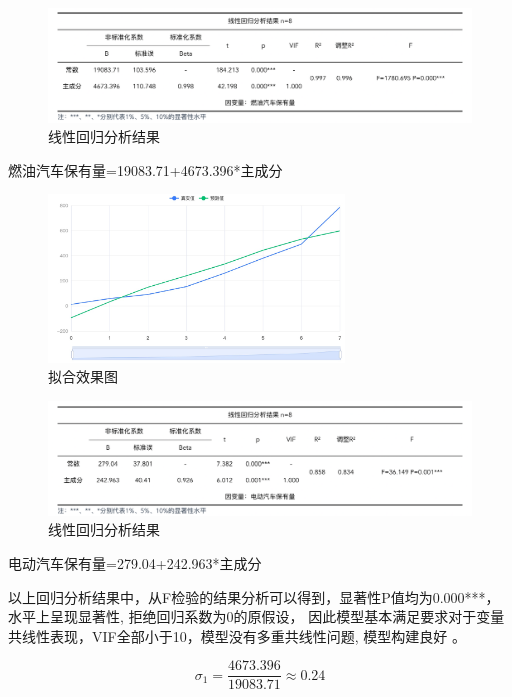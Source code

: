 \documentclass[12pt, a4paper, oneside]{ctexart}
\begin{document}
\begin{figure}[H]
  \centering
  \includegraphics[width=\textwidth]{pic/截屏2022-05-19 下午5.30.59.png}
  \caption{线性回归分析结果}
  \label{fig:线性回归分析结果}
\end{figure}

燃油汽车保有量=19083.71+4673.396*主成分

\begin{figure}[H]
  \centering
  \includegraphics[width=0.7\textwidth]{pic/拟合效果图.jpg}
  \caption{拟合效果图}
  \label{fig:拟合效果图2}
\end{figure}

\begin{figure}[H]
  \centering
  \includegraphics[width=\textwidth]{pic/截屏2022-05-19 下午5.29.26.png}
  \caption{线性回归分析结果}
  \label{fig:线性回归分析结果2}
\end{figure}

电动汽车保有量=279.04+242.963*主成分

以上回归分析结果中，从F检验的结果分析可以得到，显著性P值均为0.000***，水平上呈现显著性,
拒绝回归系数为0的原假设，
因此模型基本满足要求对于变量共线性表现，VIF全部小于10，模型没有多重共线性问题,
模型构建良好 。

\begin{equation}
  \sigma_1=\frac{4673.396}{19083.71}\approx0.24
\end{equation}
\end{document}

